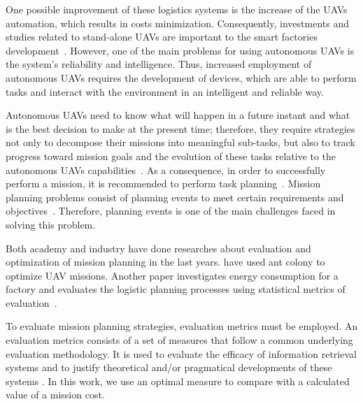 \documentclass[conference,harvard,brazil,english]{sbatex}
\begin{document}
One possible improvement of these logistics systems is the increase of the UAVs automation, which results in costs minimization. Consequently, investments and studies related to stand-alone UAVs are important to the smart factories development~\cite{hern2014dhl}. However, one of the main problems for using autonomous UAVs is the system's reliability and intelligence. Thus, increased employment of autonomous UAVs requires the development of devices, which are able to perform tasks and interact with the environment in an intelligent and reliable way.

Autonomous UAVs need to know what will happen in a future instant and what is the best decision to make at the present time; therefore, they require strategies not only to decompose their missions into meaningful sub-tasks, but also to track progress toward mission goals and the evolution of these tasks relative to the autonomous UAVs capabilities~\cite{finn2012developments}. As a consequence, in order to successfully perform a mission, it is recommended to perform task planning~\cite{finn2012developments}. Mission planning problems consist of planning events to meet certain requirements and objectives~\cite{krozel1988search}. Therefore, planning events is one of the main challenges faced in solving this problem.

Both academy and industry have done researches about evaluation and optimization of mission planning in the last years.  have used ant colony to optimize UAV missions. Another paper investigates energy consumption for a factory and evaluates the logistic planning processes using statistical metrics of evaluation~\cite{muller2012analyzing}.


To evaluate 	mission planning strategies, evaluation metrics must be employed. An evaluation metrics consists of a set of measures that follow a common underlying evaluation methodology. It is used to evaluate the efficacy of information retrieval systems and to justify theoretical and/or pragmatical developments of these systems \cite{pehcevski2009evaluation}. In this work, we use an optimal measure to compare with a calculated value of a mission cost.
\end{document}
